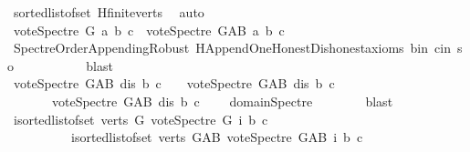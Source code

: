 \begin{isabellebody}
\ sorted{\isacharunderscore}{\kern0pt}list{\isacharunderscore}{\kern0pt}of{\isacharunderscore}{\kern0pt}set{\isacharparenleft}{\kern0pt}{}{\isacharparenright}{\kern0pt}\ H{}{\isachardot}{\kern0pt}finite{\isacharunderscore}{\kern0pt}verts\ \isamarkupfalse%
\ auto\isanewline
\ \ \ \ \ \ \isamarkupfalse%
\ \isamarkupfalse%
\ {\isachardoublequoteopen}vote{\isacharunderscore}{\kern0pt}Spectre\ G\ a\ b\ c\ {\isasymle}\ vote{\isacharunderscore}{\kern0pt}Spectre\ G{\isacharunderscore}{\kern0pt}AB\ a\ b\ c{\isachardoublequoteclose}\isanewline
\ \ \ \ \ \ \ \ \isamarkupfalse%
\ Spectre{\isacharunderscore}{\kern0pt}Order{\isacharunderscore}{\kern0pt}Appending{\isacharunderscore}{\kern0pt}Robust\ H{}{\isachardot}{\kern0pt}Append{\isacharunderscore}{\kern0pt}One{\isacharunderscore}{\kern0pt}Honest{\isacharunderscore}{\kern0pt}Dishonest{\isacharunderscore}{\kern0pt}axioms\ b{\isacharunderscore}{\kern0pt}in\ c{\isacharunderscore}{\kern0pt}in\ so\ \isanewline
\ \ \ \ \ \ \ \ \isamarkupfalse%
\ blast\isanewline
\ \ \ \ \isamarkupfalse%
\isanewline
\ \ \ \ \isamarkupfalse%
\ {\isachardoublequoteopen}vote{\isacharunderscore}{\kern0pt}Spectre\ G{\isacharunderscore}{\kern0pt}AB\ dis\ b\ c\ {\isacharequal}{\kern0pt}\ {}{\isachardoublequoteclose}\ {\isacharbar}{\kern0pt}\ {\isachardoublequoteopen}vote{\isacharunderscore}{\kern0pt}Spectre\ G{\isacharunderscore}{\kern0pt}AB\ dis\ b\ c\ {\isacharequal}{\kern0pt}\ {}{\isachardoublequoteclose}\ \isanewline
\ \ \ \ \ \ {\isacharbar}{\kern0pt}\ {\isachardoublequoteopen}vote{\isacharunderscore}{\kern0pt}Spectre\ G{\isacharunderscore}{\kern0pt}AB\ dis\ b\ c\ {\isacharequal}{\kern0pt}\ {\isacharminus}{\kern0pt}{}{\isachardoublequoteclose}\ \isamarkupfalse%
\ domain{\isacharunderscore}{\kern0pt}Spectre\isanewline
\ \ \ \ \ \ \isamarkupfalse%
\ blast\isanewline
\ \ \ \ \isamarkupfalse%
\ \isamarkupfalse%
\ {\isachardoublequoteopen}{\isacharparenleft}{\kern0pt}{\isasymSum}i{\isasymleftarrow}sorted{\isacharunderscore}{\kern0pt}list{\isacharunderscore}{\kern0pt}of{\isacharunderscore}{\kern0pt}set\ {\isacharparenleft}{\kern0pt}verts\ G{\isacharparenright}{\kern0pt}{\isachardot}{\kern0pt}\ vote{\isacharunderscore}{\kern0pt}Spectre\ G\ i\ b\ c{\isacharparenright}{\kern0pt}\ {\isasymle}\isanewline
\ \ \ \ \ \ \ \ \ \ {\isacharparenleft}{\kern0pt}{\isasymSum}i{\isasymleftarrow}sorted{\isacharunderscore}{\kern0pt}list{\isacharunderscore}{\kern0pt}of{\isacharunderscore}{\kern0pt}set\ {\isacharparenleft}{\kern0pt}verts\ G{\isacharunderscore}{\kern0pt}AB{\isacharparenright}{\kern0pt}{\isachardot}{\kern0pt}\ vote{\isacharunderscore}{\kern0pt}Spectre\ G{\isacharunderscore}{\kern0pt}AB\ i\ b\ c{\isacharparenright}{\kern0pt}{\isachardoublequoteclose}\isanewline

\end{isabellebody}
